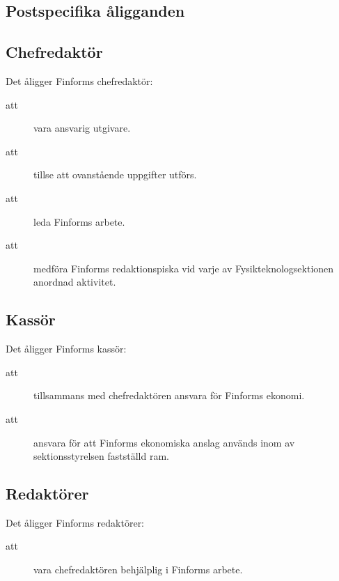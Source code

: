 \documentclass[a4paper]{article}
\begin{document}
\begin{foreningenv}{\forening{}}
    \section{Postspecifika åligganden}
    \subsection{Chefredaktör}
    Det åligger Finforms chefredaktör:
    \begin{description}
        \item[att] vara ansvarig utgivare. 
        \item[att] tillse att ovanstående uppgifter utförs.
        \item[att] leda Finforms arbete.
        \item[att] medföra Finforms redaktionspiska vid varje av Fysikteknologsektionen anordnad aktivitet.
    \end{description}
    
    
    \subsection{Kassör}
    Det åligger Finforms kassör:
    \begin{description}
        \item[att] tillsammans med chefredaktören ansvara för Finforms ekonomi.
        \item[att] ansvara för att Finforms ekonomiska anslag används inom av sektionsstyrelsen fastställd ram.
    \end{description}
    
    \subsection{Redaktörer}
    Det åligger Finforms redaktörer:
    \begin{description}
        \item[att] vara chefredaktören behjälplig i Finforms arbete.
    \end{description}
    

\end{foreningenv}
\end{document}
